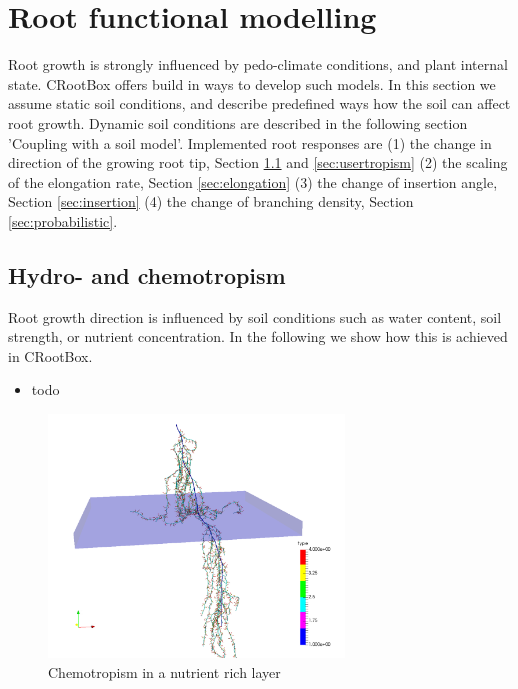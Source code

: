 \documentclass[a4paper]{article}
\begin{document}
\section{Root functional modelling}

Root growth is strongly influenced by pedo-climate conditions, and plant internal state. CRootBox offers build in ways to develop such models. 
In this section we assume static soil conditions, and describe predefined ways how the soil can affect root growth.
Dynamic soil conditions are described in the following section 'Coupling with a soil model'. 
Implemented root responses are (1) the change in direction of the growing root tip, Section \ref{sec:hydro} and \ref{sec:usertropism} 
(2) the scaling of the elongation rate, Section \ref{sec:elongation} (3) the change of insertion angle, Section \ref{sec:insertion} (4) the change of branching density, Section \ref{sec:probabilistic}.

\subsection{Hydro- and chemotropism} \label{sec:hydro}

Root growth direction is influenced by soil conditions such as water content, soil strength, or nutrient concentration. 
In the following we show how this is achieved in CRootBox.



\begin{itemize}

\item[1] todo

\end{itemize}

\begin{figure}
\centering
\includegraphics[width=0.7\textwidth]{example4a.png}
\caption{Chemotropism in a nutrient rich layer} \label{fig:chemo}
\end{figure}
\end{document}
